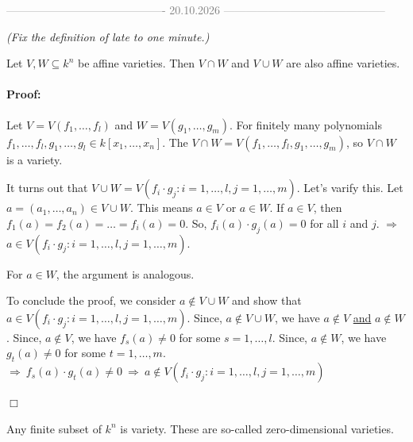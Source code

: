 \clearpage
\begin{center}
    \textcolor{gray}{------------------------------------------- 20.10.2026 --------------------------------------------} \\[0.3em]
\end{center} 
\vspace{0.5cm} 
 
\hspace*{0.5cm}\textcolor{airforceblue}{\textit{(Fix the definition of late to one minute.)}} \\  

\begin{lemma}[title = Lemma 1.2.3]
  Let $V, W \subseteq k^n$ be affine varieties. Then $V \cap W$ and $V \cup W$ are also affine varieties. 

  \paragraph{Proof:} Let $V = V(f_1, \ldots, f_l)$ and $W = V(g_1, \ldots, g_m)$. For finitely many polynomials $f_1, \ldots, f_l, g_1, \ldots, g_l \in k[x_1, \dots, x_n]$. 
  The $V \cap W = V(f_1, \ldots, f_l, g_1, \ldots, g_m)$, so $V \cap W$ is a variety.  

  It turns out that $V \cup W = V(f_i \cdot g_j: i =1, \ldots, l, j = 1, \ldots, m)$.
  Let's varify this. Let $a = (a_1, \ldots, a_n) \in V \cup W$. This means $a \in V$ or $a \in W$. If $a \in V$, then $f_1(a) = f_2(a) = \ldots = f_i(a) = 0$. So, 
  $f_i(a)\cdot g_j(a) = 0$ for all $i$ and $j$. $\Rightarrow$ $a \in V(f_i \cdot g_j: i = 1, \ldots, l, j = 1, \ldots, m)$. 

  For $a \in W$, the argument is analogous. 
  
  To conclude the proof, we consider $a \notin V \cup W$ and show that $a \in V(f_i \cdot g_j: i = 1, \ldots, l, j = 1, \ldots, m)$. 
  Since, $a \notin V\cup W$, we have $a \notin V$ \underline{and} $a \notin W$. Since, $a \notin V$, we have $f_s(a) \neq 0$ for some $s = 1, \ldots, l$. Since, $a \notin W$, 
  we have $g_t(a) \neq 0$ for some $t = 1, \ldots, m$. $\Rightarrow \ f_s(a) \cdot g_t(a) \neq 0 \ \Rightarrow \ a \notin V(f_i \cdot g_j: i = 1, \ldots, l, j = 1, \ldots, m)$   

  \begin{flushright}
    $\Box $
  \end{flushright}

\end{lemma}

\begin{remark}[title = Remark 1.2.3a]
  Any finite subset of $k^n$ is variety. These are so-called zero-dimensional varieties.
\end{remark}

